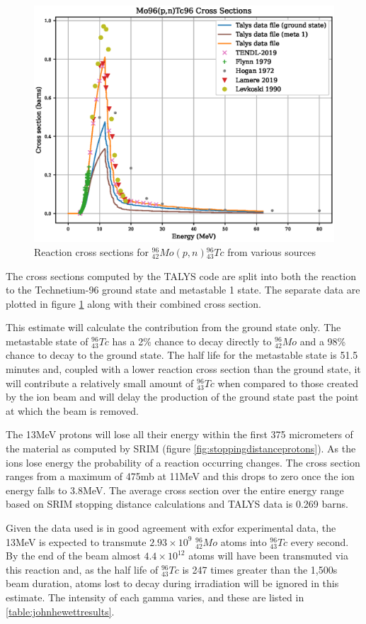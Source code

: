 \begin{figure}[htb]
\centering
\includegraphics[width=0.7\linewidth]{chapters/activity_code/mo96_tc96/Mo96_Tc96.eps}
\caption{Reaction cross sections for ${}^{96}_{42}Mo (p, n) {}^{96}_{43}Tc$ from various sources}
\label{fig:mo96tc96xs}
\end{figure}

The cross sections computed by the TALYS code are split into both the reaction to the Technetium-96 ground state and metastable 1 state.  The separate data are plotted in figure \ref{fig:mo96tc96xs} along with their combined cross section.  

This estimate will calculate the contribution from the ground state only.  The metastable state of ${}^{96}_{43}Tc$ has a 2\% chance to decay directly to ${}^{96}_{42}Mo$ and a 98\% chance to decay to the ground state.  The half life for the metastable state is 51.5 minutes\cite{jeff311} and, coupled with a lower reaction cross section than the ground state, it will contribute a relatively small amount of ${}^{96}_{43}Tc$ when compared to those created by the ion beam and will delay the production of the ground state past the point at which the beam is removed.

The 13MeV protons will lose all their energy within the first 375 micrometers of the material as computed by SRIM (figure \ref{fig:stoppingdistanceprotons}).  As the ions lose energy the probability of a reaction occurring changes.  The cross section ranges from a maximum of 475mb at 11MeV and this drops to zero once the ion energy falls to 3.8MeV.  The average cross section over the entire energy range based on SRIM stopping distance calculations and TALYS data is 0.269 barns.

Given the data used is in good agreement with \acrshort{exfor} experimental data, the 13MeV is expected to transmute $2.93 \times 10^9$ ${}^{96}_{42}Mo$ atoms into ${}^{96}_{43}Tc$ every second.  By the end of the beam almost $4.4 \times 10^{12}$ atoms will have been transmuted via this reaction and, as the half life of ${}^{96}_{43}Tc$ is 247 times greater than the 1,500s beam duration, atoms lost to decay during irradiation will be ignored in this estimate. The intensity of each gamma varies, and these are listed in \ref{table:johnhewettresults}.

